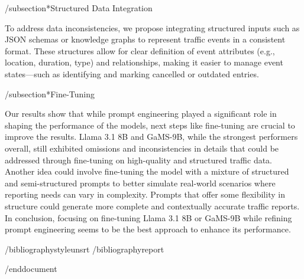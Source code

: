 /subsection*{Structured Data Integration}

To address data inconsistencies, we propose integrating structured inputs such as JSON schemas or knowledge graphs to represent traffic events in a consistent format. These structures allow for clear definition of event attributes (e.g., location, duration, type) and relationships, making it easier to manage event states—such as identifying and marking cancelled or outdated entries.

/subsection*{Fine-Tuning}

Our results show that while prompt engineering played a significant role in shaping the performance of the models, next steps like fine-tuning are crucial to improve the results. Llama 3.1 8B and GaMS-9B, while the strongest performers overall, still exhibited omissions and inconsistencies in details that could be addressed through fine-tuning on high-quality and structured traffic data. Another idea could involve fine-tuning the model with a mixture of structured and semi-structured prompts to better simulate real-world scenarios where reporting needs can vary in complexity. Prompts that offer some flexibility in structure could generate more complete and contextually accurate traffic reports. In conclusion, focusing on fine-tuning Llama 3.1 8B or GaMS-9B while refining prompt engineering seems to be the best approach to enhance its performance.

/bibliographystyle{unsrt}
/bibliography{report}


/end{document}
